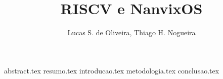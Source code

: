\documentclass[12pt]{article}
\title{RISCV e NanvixOS}
\author{Lucas S. de Oliveira\inst{1}, Thiago H. Nogueira\inst{1}}
\begin{document}
    \maketitle

    {abstract.tex}
    {resumo.tex}
    {introducao.tex}
    {metodologia.tex}
    {conclusao.tex}
    
    
    
\end{document}

